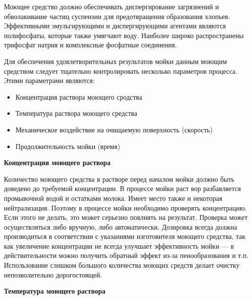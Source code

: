 \documentclass[a4paper,12pt,oneside]{extarticle}
\begin{document}
	\begin{flushleft}
			Моющее средство должно обеспечивать диспергирование загрязнений и обволакивание частиц суспензии для предотвращения образования хлопьев. Эффективными эмульгирующими и диспергирующими агентами являются полифосфаты, которые также умягчают воду. Наиболее широко распространены трифосфат натрия и комплексные фосфатные соединения.
	\end{flushleft}
	 
	 	\begin{flushleft}
	 	Для обеспечения удовлетворительных результатов мойки данным моющим средством следует тщательно контролировать несколько параметров процесса. Этими параметрами являются:
	 \end{flushleft}
	 
	 \begin{itemize}
	 	\item Концентрация раствора моющего сродства
	 	\item Температура раствора моющего средства
	 	\item Механическое воздействие на очищаемую поверхность (скорость)
	 	\item Продолжительность мойки (время)
	 \end{itemize}
	 
	 \begin{flushleft}
	 	\bfseries 	Концентрация моющего раствора
	 \end{flushleft}	
	 
	 	\begin{flushleft}
	 		Количество моющего средства в растворе перед началом мойки должно быть доведено до требуемой концентрации. В процессе мойки раст вор разбавляется промывочной водой и остатками молока. Имеет место также и некоторая нейтрализация. Поэтому в процессе мойки необходимо проверять концентрацию. Если этого не делать, это может серьезно повлиять на результат. Проверка может осуществляться либо вручную, либо автоматически. Дозировка всегда должна производиться в соответствии с указаниями изготовителя моющего средства, так как увеличение концентрации не всегда улучшает эффективность мойки — в действительности можно получить обратный эффект из-за пенообразования и т.п. Использование слишком большого количества моющих средств делает очистку непозволительно дорогостоящей.
	 \end{flushleft}
	 
	 
	 \begin{flushleft}
	 	\bfseries 	Температура моющего раствора
	 \end{flushleft}	
	 
\end{document}

